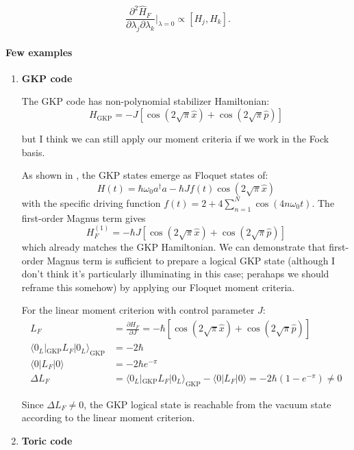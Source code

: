 \documentclass[ a4paper, 
                amsfonts, 
                amssymb, 
                amsmath, 
                reprint, 
                showkeys, 
                nofootinbib,
                superscriptaddress, 
                onecolumn, 
                notitlepage,
                aps,
                pra,
                longbibliography]{revtex4-1}
\theoremstyle{definition}
\begin{document}
\begin{equation}
\frac{\partial^2 \hat{H}_F}{\partial \lambda_j \partial \lambda_k}\bigg|_{\lambda=0} \propto [H_j, H_k].
\end{equation}

\paragraph{Few examples}

\begin{enumerate}
    \item \textbf{GKP code}

    The GKP code has non-polynomial stabilizer Hamiltonian:
\begin{equation}
H_{\text{GKP}} = -J[\cos(2\sqrt{\pi}\hat{x}) + \cos(2\sqrt{\pi}\hat{p})]
\end{equation}

but I think we can still apply our moment criteria if we work in the Fock basis. 

    As shown in \cite{Kolesnikow_2024}, the GKP states emerge as Floquet states of:
\begin{equation}
H(t) = \hbar\omega_0 a^\dagger a - \hbar J f(t) \cos(2\sqrt{\pi}\hat{x})
\end{equation}
with the specific driving function $f(t) = 2 + 4\sum_{n=1}^N \cos(4n\omega_0 t)$. The first-order Magnus term gives
\begin{equation}
H_F^{(1)} = -\hbar J [\cos(2\sqrt{\pi}\hat{x}) + \cos(2\sqrt{\pi}\hat{p})]
\end{equation}
which already matches the GKP Hamiltonian.
We can demonstrate that first-order Magnus term is sufficient to prepare a logical GKP state (although I don't think it's particularly illuminating in this case; perahaps we should reframe this somehow) by applying our Floquet moment criteria.

For the linear moment criterion with control parameter $J$:
\begin{align}
L_F &= \frac{\partial H_F}{\partial J} = -\hbar [\cos(2\sqrt{\pi}\hat{x}) + \cos(2\sqrt{\pi}\hat{p})] \\
\langle 0_L|_{\text{GKP}} L_F |0_L\rangle_{\text{GKP}} &= -2\hbar \\
\langle 0 | L_F | 0 \rangle &= -2\hbar e^{-\pi} \\
\Delta L_F &= \langle 0_L|_{\text{GKP}} L_F |0_L\rangle_{\text{GKP}} - \langle 0 | L_F | 0 \rangle = -2\hbar(1 - e^{-\pi}) \neq 0
\end{align}

Since $\Delta L_F \neq 0$, the GKP logical state is reachable from the vacuum state according to the linear moment criterion.




     \item \textbf{Toric code}
\end{enumerate}
\end{document}
